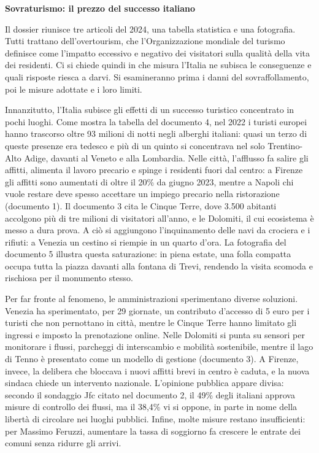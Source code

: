\documentclass[11pt,a4paper]{article}
\begin{document}
\textbf{Sovraturismo: il prezzo del successo italiano}

Il dossier riunisce tre articoli del 2024, una tabella statistica e una fotografia. Tutti trattano dell'overtourism, che l'Organizzazione mondiale del turismo definisce come l'impatto eccessivo e negativo dei visitatori sulla qualità della vita dei residenti. Ci si chiede quindi in che misura l'Italia ne subisca le conseguenze e quali risposte riesca a darvi. Si esamineranno prima i danni del sovraffollamento, poi le misure adottate e i loro limiti.

Innanzitutto, l'Italia subisce gli effetti di un successo turistico concentrato in pochi luoghi. Come mostra la tabella del documento 4, nel 2022 i turisti europei hanno trascorso oltre 93 milioni di notti negli alberghi italiani: quasi un terzo di queste presenze era tedesco e più di un quinto si concentrava nel solo Trentino-Alto Adige, davanti al Veneto e alla Lombardia. Nelle città, l'afflusso fa salire gli affitti, alimenta il lavoro precario e spinge i residenti fuori dal centro: a Firenze gli affitti sono aumentati di oltre il 20\% da giugno 2023, mentre a Napoli chi vuole restare deve spesso accettare un impiego precario nella ristorazione (documento 1). Il documento 3 cita le Cinque Terre, dove 3.500 abitanti accolgono più di tre milioni di visitatori all'anno, e le Dolomiti, il cui ecosistema è messo a dura prova. A ciò si aggiungono l'inquinamento delle navi da crociera e i rifiuti: a Venezia un cestino si riempie in un quarto d'ora. La fotografia del documento 5 illustra questa saturazione: in piena estate, una folla compatta occupa tutta la piazza davanti alla fontana di Trevi, rendendo la visita scomoda e rischiosa per il monumento stesso.

Per far fronte al fenomeno, le amministrazioni sperimentano diverse soluzioni. Venezia ha sperimentato, per 29 giornate, un contributo d'accesso di 5 euro per i turisti che non pernottano in città, mentre le Cinque Terre hanno limitato gli ingressi e imposto la prenotazione online. Nelle Dolomiti si punta su sensori per monitorare i flussi, parcheggi di interscambio e mobilità sostenibile, mentre il lago di Tenno è presentato come un modello di gestione (documento 3). A Firenze, invece, la delibera che bloccava i nuovi affitti brevi in centro è caduta, e la nuova sindaca chiede un intervento nazionale. L'opinione pubblica appare divisa: secondo il sondaggio Jfc citato nel documento 2, il 49\% degli italiani approva misure di controllo dei flussi, ma il 38,4\% vi si oppone, in parte in nome della libertà di circolare nei luoghi pubblici. Infine, molte misure restano insufficienti: per Massimo Feruzzi, aumentare la tassa di soggiorno fa crescere le entrate dei comuni senza ridurre gli arrivi.
\end{document}
